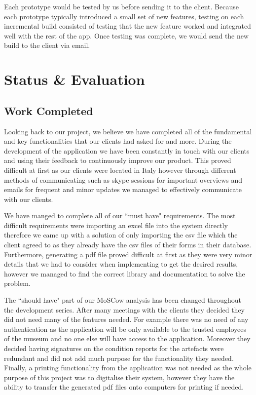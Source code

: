 \documentclass[12pt]{article}
\begin{document}
Each prototype would be tested by us before sending it to the client. Because each prototype typically introduced a small set of new features, testing on each incremental build consisted of testing that the new feature worked and integrated well with the rest of the app. Once testing was complete, we would send the new build to the client via email. 

\section{Status \& Evaluation}
\subsection{Work Completed}
Looking back to our project, we believe we have completed all of the fundamental and key functionalities that our clients had asked for and more. During the development of the application we have been constantly in touch with our clients and using their feedback to continuously improve our product. This proved difficult at first as our clients were located in Italy however through different methods of communicating such as skype sessions for important overviews and emails for frequent and minor updates we managed to effectively communicate with our clients. 

\par
We have manged to complete all of our ``must have" requirements. The most difficult requirements were importing an excel file into the system directly therefore we came up with a solution of only importing the csv file which the client agreed to as they already have the csv files of their forms in their database. Furthermore, generating a pdf file proved difficult at first as they were very minor details that we had to consider when implementing to get the desired results, however we managed to find the correct library and documentation to solve the problem.

\par
The ``should have" part of our MoSCow analysis has been changed throughout the development series. After many meetings with the clients they decided they did not need many of the features needed. For example there was no need of any authentication as the application will be only available to the trusted employees of the museum and no one else will have access to the application. Moreover they decided having signatures on the condition reports for the artefacts were redundant and did not add much purpose for the functionality they needed. Finally, a printing functionality from the application was not needed as the whole purpose of this project was to digitalise their system, however they have the ability to transfer the generated pdf files onto computers for printing if needed.
\end{document}
